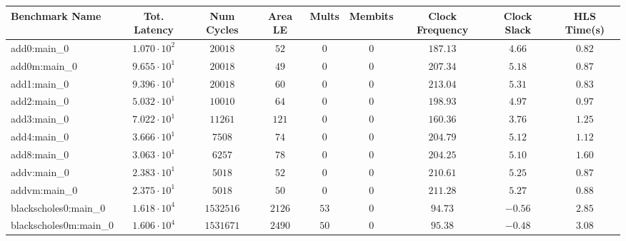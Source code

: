 \begin{tabular}{|l|c|c|c|c|c|c|c|c|}
\hline
Benchmark Name                 & Tot. Latency           & Num Cycles   & Area LE    & Mults    & Membits      & Clock Frequency & Clock Slack & HLS Time(s) \\
\hline
add0:main\_0                   & $ 1.070 \cdot 10^{2} $ & $ 20018    $ & $ 52     $ & $ 0    $ & $ 0        $ & $ 187.13      $ & $ 4.66    $ & $ 0.82    $ \\
add0m:main\_0                  & $ 9.655 \cdot 10^{1} $ & $ 20018    $ & $ 49     $ & $ 0    $ & $ 0        $ & $ 207.34      $ & $ 5.18    $ & $ 0.87    $ \\
add1:main\_0                   & $ 9.396 \cdot 10^{1} $ & $ 20018    $ & $ 60     $ & $ 0    $ & $ 0        $ & $ 213.04      $ & $ 5.31    $ & $ 0.83    $ \\
add2:main\_0                   & $ 5.032 \cdot 10^{1} $ & $ 10010    $ & $ 64     $ & $ 0    $ & $ 0        $ & $ 198.93      $ & $ 4.97    $ & $ 0.97    $ \\
add3:main\_0                   & $ 7.022 \cdot 10^{1} $ & $ 11261    $ & $ 121    $ & $ 0    $ & $ 0        $ & $ 160.36      $ & $ 3.76    $ & $ 1.25    $ \\
add4:main\_0                   & $ 3.666 \cdot 10^{1} $ & $ 7508     $ & $ 74     $ & $ 0    $ & $ 0        $ & $ 204.79      $ & $ 5.12    $ & $ 1.12    $ \\
add8:main\_0                   & $ 3.063 \cdot 10^{1} $ & $ 6257     $ & $ 78     $ & $ 0    $ & $ 0        $ & $ 204.25      $ & $ 5.10    $ & $ 1.60    $ \\
addv:main\_0                   & $ 2.383 \cdot 10^{1} $ & $ 5018     $ & $ 52     $ & $ 0    $ & $ 0        $ & $ 210.61      $ & $ 5.25    $ & $ 0.87    $ \\
addvm:main\_0                  & $ 2.375 \cdot 10^{1} $ & $ 5018     $ & $ 50     $ & $ 0    $ & $ 0        $ & $ 211.28      $ & $ 5.27    $ & $ 0.88    $ \\
blackscholes0:main\_0          & $ 1.618 \cdot 10^{4} $ & $ 1532516  $ & $ 2126   $ & $ 53   $ & $ 0        $ & $ 94.73       $ & $ -0.56   $ & $ 2.85    $ \\
blackscholes0m:main\_0         & $ 1.606 \cdot 10^{4} $ & $ 1531671  $ & $ 2490   $ & $ 50   $ & $ 0        $ & $ 95.38       $ & $ -0.48   $ & $ 3.08    $ \\

\end{tabular}
